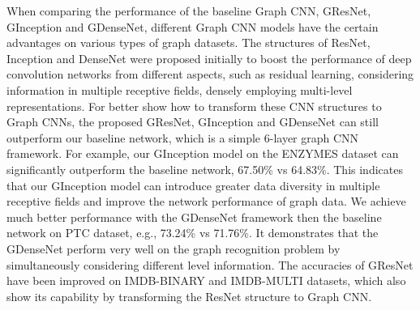 \documentclass[journal]{IEEEtran}
\begin{document}
When comparing the performance of the baseline Graph CNN, G\underline{\hspace{0.5em}}ResNet, G\underline{\hspace{0.5em}}Inception and G\underline{\hspace{0.5em}}DenseNet, different Graph CNN models have the certain advantages on various types of graph datasets.
The structures of ResNet, Inception and DenseNet were proposed initially to boost the performance of deep convolution networks from different aspects, such as residual learning, considering information in multiple receptive fields, densely employing multi-level representations.
For better show how to transform these CNN structures to Graph CNNs, the proposed G\underline{\hspace{0.5em}}ResNet, G\underline{\hspace{0.5em}}Inception and G\underline{\hspace{0.5em}}DenseNet can still outperform our baseline network, which is a simple 6-layer graph CNN framework.
For example, our  G\underline{\hspace{0.5em}}Inception model on the ENZYMES dataset can significantly outperform the baseline network, 67.50\% vs 64.83\%. 	This indicates that our  G\underline{\hspace{0.5em}}Inception model can introduce greater data diversity in multiple receptive fields and improve the network performance of graph data.
We achieve much better performance with the G\underline{\hspace{0.5em}}DenseNet framework then the baseline network on PTC dataset, e.g., 73.24\% vs 71.76\%. It demonstrates that the G\underline{\hspace{0.5em}}DenseNet perform very well on the graph recognition problem by simultaneously considering different level information.
The accuracies of G\underline{\hspace{0.5em}}ResNet have been improved on IMDB-BINARY and IMDB-MULTI datasets, which also show its capability by transforming the ResNet structure to Graph CNN.
\end{document}
